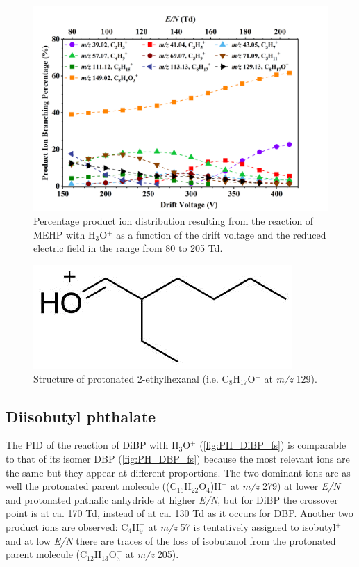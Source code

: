 \begin{figure}[htb]%
\centering
\includegraphics[height=0.4\textheight]{pics/MEHP-BR.png}
\caption{Percentage product ion distribution resulting from the reaction of MEHP with H$_3$O$^+$ as a function of the drift voltage and the reduced electric field in the range from 80 to 205 Td.}
\label{fig:PH_MEHP_fs}
\end{figure}


\begin{figure}[htb]%
\centering
\includegraphics[height=0.05\textheight]{pics/PH/MEHP_frag.png}
\caption{Structure of protonated 2-ethylhexanal (i.e. C$_8$H$_{17}$O$^+$ at \textit{m/z} 129).}
\label{fig:PH_MEHP_frag}
\end{figure}


\subsection{Diisobutyl phthalate}

The PID of the reaction of DiBP with H$_3$O$^+$ (\autoref{fig:PH_DiBP_fs}) is comparable to that of its isomer DBP (\autoref{fig:PH_DBP_fs}) because the most relevant ions are the same but they appear at different  proportions.
The two dominant ions are as well the protonated parent molecule ((C$_{16}$H$_{22}$O$_4$)H$^+$ at \textit{m/z} 279) at lower \textit{E/N} and protonated phthalic anhydride at higher \textit{E/N}, but for DiBP the crossover point is at ca. 170 Td, instead of at ca. 130 Td as it occurs for DBP.
Another two product ions are observed:  C$_4$H$_9^+$ at \textit{m/z} 57 is tentatively assigned to isobutyl$^+$ and 
at low \textit{E/N} there are traces of the loss of isobutanol from the protonated parent molecule (C$_{12}$H$_{13}$O$_3^+$ at \textit{m/z} 205).




